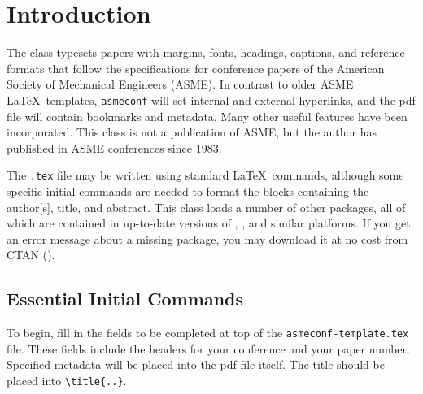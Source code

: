 \documentclass[captionpatch,colorlinks,upint,subscriptcorrection,varvw,german]{asmeconf}
\begin{document}
\begin{nomenclature}



\end{nomenclature}


\section{Introduction}
The \texttt{} class typesets papers with margins, fonts, headings, captions, and reference formats that follow the specifications for conference papers of the American Society of Mechanical Engineers (ASME). In contrast to older ASME \LaTeX\ templates, \texttt{asmeconf} will set internal and external hyperlinks, and the pdf file will contain bookmarks and metadata. Many other useful features have been incorporated. This class is not a publication of ASME, but the author has published in ASME conferences since 1983. 

The \texttt{.tex} file may be written using standard \LaTeX\ commands, although some specific initial commands are needed to format the blocks containing the author[s], title, and abstract.  This class loads a number of other packages, all of which are contained in up-to-date versions of , , and similar platforms. If you get an error message about a missing package, you may download it at no cost from CTAN (). 

\subsection{Essential Initial Commands}

To begin, fill in the fields to be completed at top of the \texttt{asmeconf-template.tex} file. These fields include the headers for your conference and your paper number. Specified metadata will be placed into the pdf file itself. 
The title should be placed into \verb|\title{..}|. 
\end{document}
